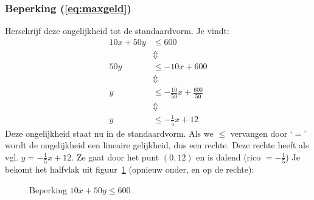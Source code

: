 \subsubsection{Beperking (\ref{eq:maxgeld})}
Herschrijf deze ongelijkheid tot de standaardvorm. Je vindt:
\begin{align*}
    10x+50y &\leqslant 600 \\
     & \Updownarrow   \\
    50y & \leqslant  -10x+600  \\
     & \Updownarrow    \\
    y & \leqslant  -\frac{10}{50}x+\frac{600}{50}  \\
     & \Updownarrow    \\
    y & \leqslant  -\frac{1}{5}x+12
\end{align*}
Deze ongelijkheid staat nu in de standaardvorm. Als we $\leqslant$
vervangen door `$=$' wordt de ongelijkheid een lineaire gelijkheid,
dus een rechte. Deze rechte heeft als vgl. $y=-\frac{1}{5}x+12$.
Ze gaat door het punt $(0,12)$ en is dalend (rico $=-\frac{1}{5}$)
Je bekomt het halfvlak uit figuur~\ref{fig:budget} (opnieuw onder, en op de
rechte):
\begin{figure}[tbp]
    \centering
{}
    \caption{Beperking $10x+50y 
    \leqslant 600$}
    \label{fig:budget}
\end{figure}



